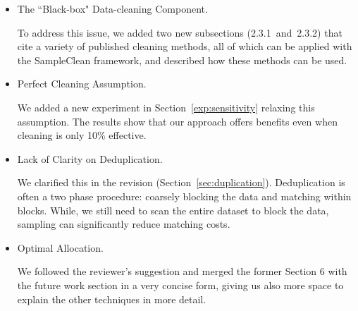 \begin{itemize}

  \item The ``Black-box" Data-cleaning Component.
  
To address this issue, we added two new subsections (2.3.1~and~2.3.2) that cite a variety of published cleaning methods, all of which can be applied with the SampleClean framework, and described how these methods can be used. 

  \item Perfect Cleaning Assumption. 

We added a new experiment in Section~\ref{exp:sensitivity} relaxing this assumption. The results show that our approach offers benefits even when cleaning is only 10\% effective.

  \item Lack of Clarity on Deduplication.
  
   We clarified this in the revision (Section~\ref{sec:duplication}). 
Deduplication is often a two phase procedure: coarsely blocking the data and matching within blocks.
While, we still need to scan the entire dataset to block the data, sampling can significantly reduce matching costs. 



  \item Optimal Allocation. 

We followed the reviewer's suggestion and merged the former Section 6 with the future work section in a very concise form, giving us also more space to explain the other techniques in more detail. 



\end{itemize}
